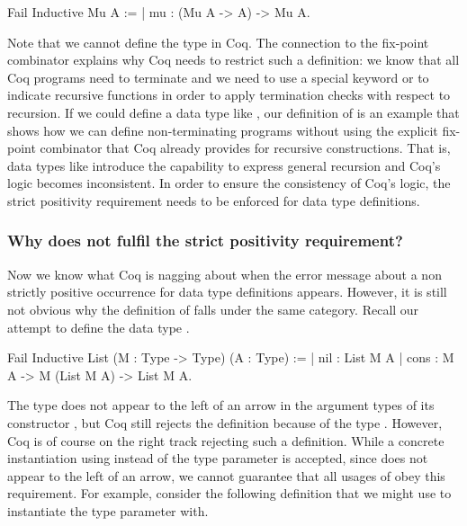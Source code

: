 \begin{coqcode}
Fail Inductive Mu A :=
| mu : (Mu A -> A) -> Mu A.
\end{coqcode}

Note that we cannot define the type  in Coq.
The connection to the fix\--point combinator explains why Coq needs to restrict such a definition: we know that all Coq programs need to terminate and we need to use a special keyword  or  to indicate recursive functions in order to apply termination checks with respect to recursion.
If we could define a data type like , our definition of  is an example that shows how we can define non\--terminating programs without using the explicit fix\--point combinator that Coq already provides for recursive constructions.
That is, data types like  introduce the capability to express general recursion and Coq's logic becomes inconsistent.
In order to ensure the consistency of Coq's logic, the strict positivity requirement needs to be enforced for data type definitions.

\subsubsection{Why does  not fulfil the strict positivity requirement?}

Now we know what Coq is nagging about when the error message about a non strictly positive occurrence for data type definitions appears.
However, it is still not obvious why the definition of  falls under the same category.
Recall our attempt to define the data type .

\begin{coqcode}
Fail Inductive List (M : Type -> Type) (A : Type) :=
| nil : List M A
| cons : M A -> M (List M A) -> List M A.
\end{coqcode}

The type  does not appear to the left of an arrow in the argument types of its constructor , but Coq still rejects the definition because of the type .
However, Coq is of course on the right track rejecting such a definition.
While a concrete instantiation using  instead of the type parameter  is accepted, since  does not appear to the left of an arrow, we cannot guarantee that all usages of  obey this requirement.
For example, consider the following definition that we might use to instantiate the type parameter with.

